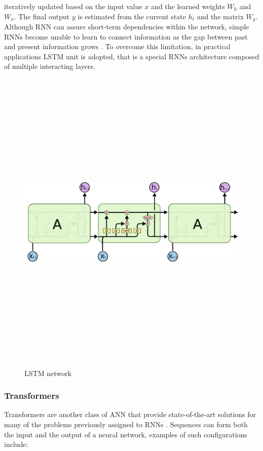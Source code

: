 iteratively updated based on the input value $x$ and the learned weights $W_h$  
and $W_x$. The final output $y$  is estimated from the current state $h_t$  
and the matrix $W_y$. Although RNN can assure short-term dependencies within 
the network, simple RNNs become unable to learn to connect information as the 
gap between past and present information grows \cite{lstm}. To overcome this 
limitation, in practical applications LSTM unit is adopted, that is a special 
RNNs architecture composed of multiple interacting layers.
\begin{figure}[H]
    \centering
    \includegraphics[width=15cm,height=15cm,keepaspectratio]{Background/rnn3.png}
    \caption{LSTM network}
    \label{rnn3}
\end{figure} 

\subsubsection{Transformers}

Transformers are another class of ANN that provide state-of-the-art solutions 
for many of the problems previously assigned to RNNs \cite{transformers}. Sequences can form both the input and 
the output of a neural network, examples of such configurations include:

